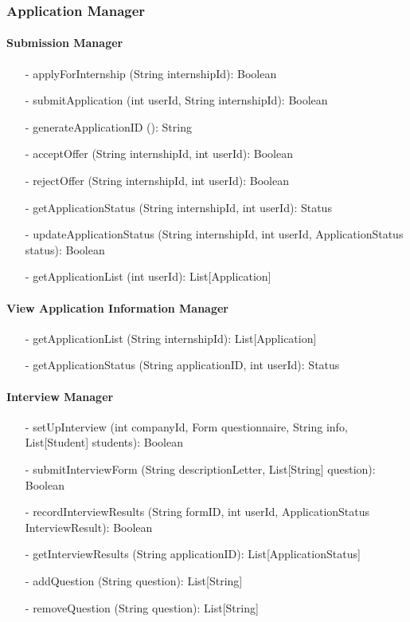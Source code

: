 \subsubsection{Application Manager}
\paragraph{Submission Manager}
\begin{itemize}
    \item[-] applyForInternship (String internshipId): Boolean
    \item[-] submitApplication (int userId, String internshipId): Boolean
    \item[-] generateApplicationID (): String
    \item[-] acceptOffer (String internshipId, int userId): Boolean
    \item[-] rejectOffer (String internshipId, int userId): Boolean
    \item[-] getApplicationStatus (String internshipId, int userId): Status
    \item[-] updateApplicationStatus (String internshipId, int userId, ApplicationStatus status): Boolean
    \item[-] getApplicationList (int userId): List[Application]
\end{itemize}

\paragraph{View Application Information Manager}
\begin{itemize}
    \item[-] getApplicationList (String internshipId): List[Application]
    \item[-] getApplicationStatus (String applicationID, int userId): Status
\end{itemize}

\paragraph{Interview Manager}
\begin{itemize}
    \item[-] setUpInterview (int companyId, Form questionnaire, String info, List[Student] students): Boolean
    \item[-] submitInterviewForm (String descriptionLetter, List[String] question): Boolean
    \item[-] recordInterviewResults (String formID, int userId, ApplicationStatus InterviewResult): Boolean
    \item[-] getInterviewResults (String applicationID): List[ApplicationStatus]
    \item[-] addQuestion (String question): List[String]
    \item[-] removeQuestion (String question): List[String]
\end{itemize}

